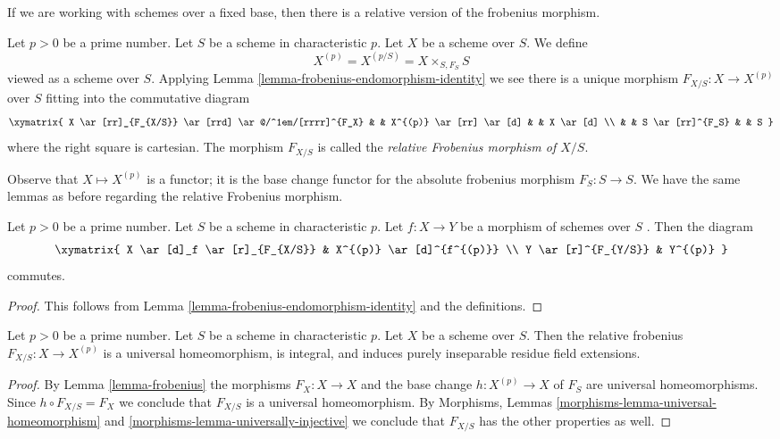 \noindent
If we are working with schemes over a fixed base, then there is a
relative version of the frobenius morphism.

\begin{definition}
\label{definition-relative-frobenius}
Let $p > 0$ be a prime number. Let $S$ be a scheme in characteristic $p$.
Let $X$ be a scheme over $S$. We define
$$
X^{(p)} = X^{(p/S)} = X \times_{S, F_S} S
$$
viewed as a scheme over $S$. Applying
Lemma \ref{lemma-frobenius-endomorphism-identity}
we see there is a unique morphism $F_{X/S} : X \longrightarrow X^{(p)}$
over $S$ fitting into the commutative diagram
$$
\xymatrix{
X \ar[rr]_{F_{X/S}} \ar[rrd] \ar@/^1em/[rrrr]^{F_X}
& & X^{(p)} \ar[rr] \ar[d] & & X \ar[d] \\
& & S \ar[rr]^{F_S} & & S
}
$$
where the right square is cartesian. The morphism $F_{X/S}$ is called the
{\it relative Frobenius morphism of $X/S$}.
\end{definition}

\noindent
Observe that $X \mapsto X^{(p)}$ is a functor; it is the base change
functor for the absolute frobenius morphism $F_S : S \to S$.
We have the same lemmas as before regarding the relative Frobenius morphism.

\begin{lemma}
\label{lemma-relative-frobenius-endomorphism-identity}
Let $p > 0$ be a prime number. Let $S$ be a scheme in characteristic $p$.
Let $f : X \to Y$ be a morphism of schemes over $S$ .
Then the diagram
$$
\xymatrix{
X \ar[d]_f \ar[r]_{F_{X/S}} & X^{(p)} \ar[d]^{f^{(p)}} \\
Y \ar[r]^{F_{Y/S}} & Y^{(p)}
}
$$
commutes.
\end{lemma}

\begin{proof}
This follows from Lemma \ref{lemma-frobenius-endomorphism-identity}
and the definitions.
\end{proof}

\begin{lemma}
\label{lemma-relative-frobenius}
Let $p > 0$ be a prime number. Let $S$ be a scheme in characteristic $p$.
Let $X$ be a scheme over $S$.
Then the relative frobenius $F_{X/S} : X \to X^{(p)}$
is a universal homeomorphism, is integral, and
induces purely inseparable residue field extensions.
\end{lemma}

\begin{proof}
By Lemma \ref{lemma-frobenius} the morphisms $F_X : X \to X$ and the base change
$h : X^{(p)} \to X$ of $F_S$ are universal homeomorphisms.
Since $h \circ F_{X/S} = F_X$ we conclude that $F_{X/S}$ is a universal
homeomorphism. By Morphisms, Lemmas
\ref{morphisms-lemma-universal-homeomorphism} and
\ref{morphisms-lemma-universally-injective}
we conclude that $F_{X/S}$ has the other properties as well.
\end{proof}

